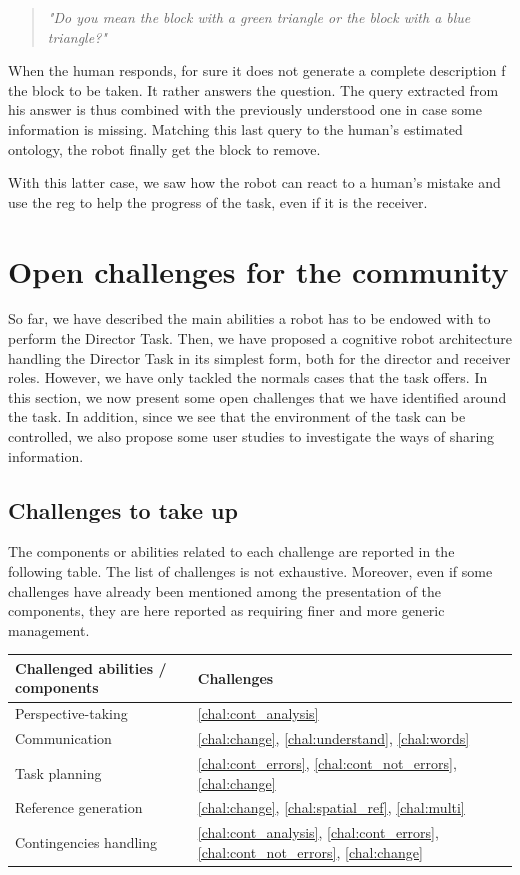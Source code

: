 \begin{quote} 
\centering 
\textit{"Do you mean the block with a green triangle or the block with a blue triangle?"}
\end{quote}

When the human responds, for sure it does not generate a complete description f the block to be taken. It rather answers the question. The query extracted from his answer is thus combined with the previously understood one in case some information is missing. Matching this last query to the human's estimated ontology, the robot finally get the block to remove.

With this latter case, we saw how the robot can react to a human's mistake and use the \acrshort{reg} to help the progress of the task, even if it is the receiver.

\section{Open challenges for the community}

So far, we have described the main abilities a robot has to be endowed with to perform the Director Task. Then, we have proposed a cognitive robot architecture handling the Director Task in its simplest form, both for the director and receiver roles. However, we have only tackled the normals cases that the task offers. In this section, we now present some open challenges that we have identified around the task. In addition, since we see that the environment of the task can be controlled, we also propose some user studies to investigate the ways of sharing information.

\subsection{Challenges to take up}

The components or abilities related to each challenge are reported in the following table. The list of challenges is not exhaustive. Moreover, even if some challenges have already been mentioned among the presentation of the components, they are here reported as requiring finer and more generic management.

\begin{center}
 \begin{tabular}{||l | l ||} 
 \hline
 Challenged abilities / components & Challenges \\ [0.5ex]
 \hline\hline
 Perspective-taking & \ref{chal:cont_analysis}  \\ 
 \hline
 Communication & \ref{chal:change}, \ref{chal:understand}, \ref{chal:words}\\
 \hline
 Task planning & \ref{chal:cont_errors}, \ref{chal:cont_not_errors}, \ref{chal:change} \\
 \hline
 Reference generation & \ref{chal:change}, \ref{chal:spatial_ref}, \ref{chal:multi} \\
 \hline
 Contingencies handling & \ref{chal:cont_analysis}, \ref{chal:cont_errors}, \ref{chal:cont_not_errors}, \ref{chal:change} \\ [1ex]
 \hline
\end{tabular}
\end{center}


